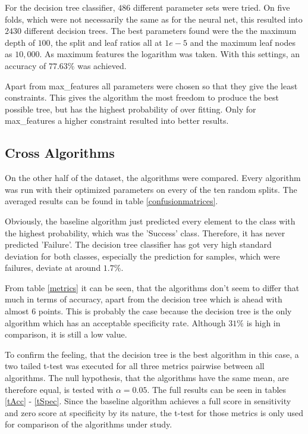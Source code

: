 \documentclass[a4paper,11pt]{article}
\begin{document}
For the decision tree classifier, $486$ different parameter sets were tried. On five folds, which were not necessarily the same as for the neural net, this resulted into $2430$ different decision trees.
The best parameters found were the the maximum depth of $100$, the split and leaf ratios all at $1e-5$ and the maximum leaf nodes as $10,000$. As maximum features the logarithm was taken. With this settings, an accuracy of $77.63\%$ was achieved. 

Apart from max\_features all parameters were chosen so that they give the least constraints. This gives the algorithm the most freedom to produce the best possible tree, but has the highest probability of over fitting. Only for max\_features a higher constraint resulted into better results.

\subsection{Cross Algorithms}





On the other half of the dataset, the algorithms were compared. Every algorithm was run with their optimized parameters on every of the ten random splits. The averaged results can be found in table \ref{confusionmatrices}.

Obviously, the baseline algorithm just predicted every element to the class with the highest probability, which was the 'Success' class. Therefore, it has never predicted 'Failure'. The decision tree classifier has got very high standard deviation for both classes, especially the prediction for samples, which were failures, deviate at around $1.7\%$. 

From table \ref{metrics} it can be seen, that the algorithms don't seem to differ that much in terms of accuracy, apart from the decision tree which is ahead with almost $6$ points. This is probably the case because the decision tree is the only algorithm which has an acceptable specificity rate. Although $31\%$ is high in comparison, it is still a low value. 

To confirm the feeling, that the decision tree is the best algorithm in this case, a two tailed t-test was executed for all three metrics pairwise between all algorithms. The null hypothesis, that the algorithms have the same mean, are therefore equal, is tested with $\alpha = 0.05$. The full results can be seen in tables \ref{tAcc} - \ref{tSpec}.
Since the baseline algorithm achieves a full score in sensitivity and zero score at specificity by its nature, the t-test for those metrics is only used for comparison of the algorithms under study.
\end{document}
